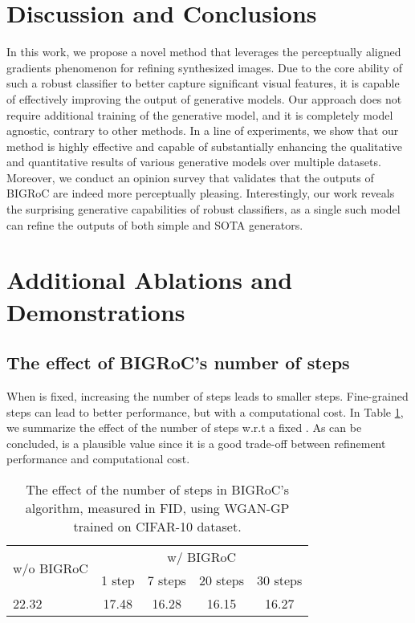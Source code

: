 \documentclass[10pt]{article} \usepackage[accepted]{tmlr}
\begin{document}
\section{Discussion and Conclusions}
In this work, we propose a novel method that leverages the perceptually aligned gradients phenomenon for refining synthesized images.
Due to the core ability of such a robust classifier to better capture significant visual features, it is capable of effectively improving the output of generative models.
Our approach does not require additional training of the generative model, and it is completely model agnostic, contrary to other methods.
In a line of experiments, we show that our method is highly effective and capable of substantially enhancing the qualitative and quantitative results of various generative models over multiple datasets. Moreover, we conduct an opinion survey that validates that the outputs of BIGRoC are indeed more perceptually pleasing. Interestingly, our work reveals the surprising generative capabilities of robust classifiers, as a single such model can refine the outputs of both simple and SOTA generators.




\clearpage
\newpage
\appendix
\onecolumn

\section{Additional Ablations and Demonstrations}
\label{sec:additional_ablations}
\subsection{The effect of BIGRoC's number of steps}
\label{sec:abl_num_steps}
When  is fixed, increasing the number of steps leads to smaller steps. Fine-grained steps can lead to better performance, but with a computational cost. In Table \ref{tab:ablation_num_steps}, we summarize the effect of the number of steps w.r.t a fixed . As can be concluded,  is a plausible value since it is a good trade-off between refinement performance and computational cost.

\begin{table}[ht]
\caption{The effect of the number of steps in BIGRoC's algorithm, measured in FID, using WGAN-GP trained on CIFAR-10 dataset.}
\begin{center}
\begin{small}
\begin{sc}
\begin{tabular}{lcccc}
\toprule
\multirow{2}{*}{w/o BIGRoC} & \multicolumn{4}{c}{w/ BIGRoC} \\
& 1 step & 7 steps & 20 steps & 30 steps\\
\midrule
22.32 & 17.48 & 16.28 & 16.15 & 16.27 \\
\bottomrule
\end{tabular}
\end{sc}
\end{small}
\end{center}
\label{tab:ablation_num_steps}
\end{table}
\end{document}
